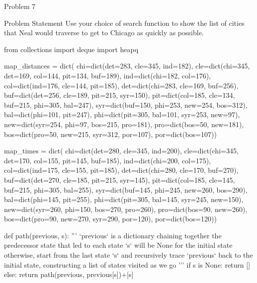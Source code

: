 \begin{problem}{Problem 7}
    \begin{statement}{Problem Statement}
        Use your choice of search function to show the list of cities that Neal would traverse to get to Chicago as quickly as possible.
    \end{statement}

    \begin{highlight}[Solution]
    \begin{code}[Python]
    from collections import deque
    import heapq
    
    map_distances = dict(
        chi=dict(det=283, cle=345, ind=182),
        cle=dict(chi=345, det=169, col=144, pit=134, buf=189),
        ind=dict(chi=182, col=176),
        col=dict(ind=176, cle=144, pit=185),
        det=dict(chi=283, cle=169, buf=256),
        buf=dict(det=256, cle=189, pit=215, syr=150),
        pit=dict(col=185, cle=134, buf=215, phi=305, bal=247),
        syr=dict(buf=150, phi=253, new=254, bos=312),
        bal=dict(phi=101, pit=247),
        phi=dict(pit=305, bal=101, syr=253, new=97),
        new=dict(syr=254, phi=97, bos=215, pro=181),
        pro=dict(bos=50, new=181),
        bos=dict(pro=50, new=215, syr=312, por=107),
        por=dict(bos=107))
    
    
    map_times = dict(
        chi=dict(det=280, cle=345, ind=200),
        cle=dict(chi=345, det=170, col=155, pit=145, buf=185),
        ind=dict(chi=200, col=175),
        col=dict(ind=175, cle=155, pit=185),
        det=dict(chi=280, cle=170, buf=270),
        buf=dict(det=270, cle=185, pit=215, syr=145),
        pit=dict(col=185, cle=145, buf=215, phi=305, bal=255),
        syr=dict(buf=145, phi=245, new=260, bos=290),
        bal=dict(phi=145, pit=255),
        phi=dict(pit=305, bal=145, syr=245, new=150),
        new=dict(syr=260, phi=150, bos=270, pro=260),
        pro=dict(bos=90, new=260),
        bos=dict(pro=90, new=270, syr=290, por=120),
        por=dict(bos=120))
    
    def path(previous, s): 
        '''
        `previous` is a dictionary chaining together the predecessor state that led to each state
        `s` will be None for the initial state
        otherwise, start from the last state `s` and recursively trace `previous` back to the initial state,
        constructing a list of states visited as we go
        '''
        if s is None:
            return []
        else:
            return path(previous, previous[s])+[s]
    

\end{code}
\end{highlight}
\end{problem}
